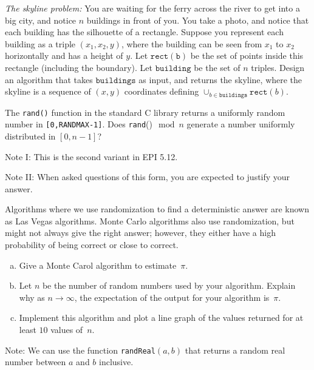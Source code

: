 \documentclass{article}
\begin{document}
\nextprob
\emph{The skyline problem:} You are waiting for the ferry across the river to
get into a big city, and notice
$n$ buildings in front of you.  You take a photo, and notice that each building
has the silhouette of a rectangle.  Suppose you  represent each building as a
triple $(x_1,x_2,y)$, where the building can be seen from $x_1$ to $x_2$
horizontally and has a height of $y$.  Let $\mathtt{rect(b)}$ be the set of
points inside this rectangle (including the boundary).  Let $\mathtt{building}$ be the set of $n$
triples. Design an algorithm that takes $\mathtt{buildings}$ as input, and
returns the skyline, where the skyline is a sequence of $(x,y)$ coordinates
defining $\cup_{b \in \mathtt{buildings}} \mathtt{rect}(b)$.

\nextprob
The \texttt{rand()} function in the standard C library returns a
uniformly random number in \texttt{[0,RANDMAX-1]}. Does \texttt{rand}()$\mod n$
generate a number uniformly distributed in $[0,n-1]$?

Note I: This is the second variant in EPI 5.12.

Note II: When asked questions of this form, you are expected to justify your
answer.

\nextprob

Algorithms where we use randomization to find a deterministic answer are known
as Las Vegas algorithms.  Monte Carlo algorithms also use randomization, but
might not always give the right answer; however, they either have a high
probability of being correct or close to correct.

\begin{enumerate}[(a)]
    \item Give a Monte Carol algorithm to estimate~$\pi$.
    \item Let $n$ be the number of random numbers used by your algorithm.
        Explain why as $n \to \infty$, the expectation of the output for your
        algorithm is~$\pi$.
    \item Implement this algorithm and plot a line graph of
        the values returned for at least $10$ values of~$n$.
\end{enumerate}

Note: We can use the function \texttt{randReal}$(a,b)$ that returns a random
real number between $a$ and $b$ inclusive.
\end{document}
